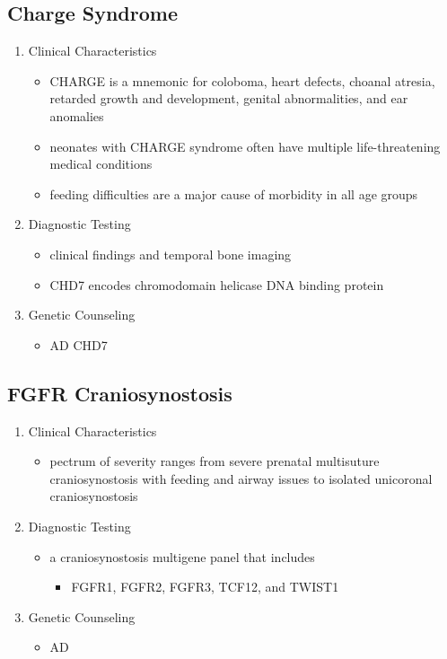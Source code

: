 \documentclass[12pt]{scrartcl}
\begin{document}
\subsection{Charge Syndrome}
\label{sec:org73e391d}
\begin{enumerate}
\item Clinical Characteristics
\label{sec:org9b73b63}
\begin{itemize}
\item CHARGE is a mnemonic for coloboma, heart defects, choanal atresia,
retarded growth and development, genital abnormalities, and ear
anomalies
\item neonates with CHARGE syndrome often have multiple life-threatening
medical conditions
\item feeding difficulties are a major cause of
morbidity in all age groups
\end{itemize}
\item Diagnostic Testing
\label{sec:org7ddcf49}
\begin{itemize}
\item clinical findings and temporal bone imaging
\item CHD7 encodes chromodomain helicase DNA binding protein
\end{itemize}
\item Genetic Counseling
\label{sec:org78f2d2f}
\begin{itemize}
\item AD CHD7
\end{itemize}
\end{enumerate}
\subsection{FGFR Craniosynostosis}
\label{sec:orgc98e6e8}
\begin{enumerate}
\item Clinical Characteristics
\label{sec:org869e6ce}
\begin{itemize}
\item pectrum of severity ranges from severe prenatal multisuture
craniosynostosis with feeding and airway issues to isolated
unicoronal craniosynostosis
\end{itemize}
\item Diagnostic Testing
\label{sec:org8dc0a62}
\begin{itemize}
\item a craniosynostosis multigene panel that includes
\begin{itemize}
\item FGFR1, FGFR2, FGFR3, TCF12, and TWIST1
\end{itemize}
\end{itemize}
\item Genetic Counseling
\label{sec:orgb56e76c}
\begin{itemize}
\item AD
\end{itemize}
\end{enumerate}
\end{document}
